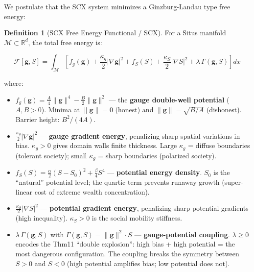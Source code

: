 \documentclass[12pt,a4paper]{article}
\theoremstyle{plain}
\theoremstyle{definition}
\newtheorem{definition}[theorem]{ Definition}
\newcommand{\R}{\mathbb{R}}
\newcommand{\cM}{\mathcal{M}}
\newcommand{\cF}{\mathcal{F}}
\newcommand{\gf}{\mathbf{g}}          %
\newcommand{\Sf}{S}                   %
\begin{document}
We postulate that the SCX system minimizes a Ginzburg-Landau type free energy:

\begin{definition}[SCX Free Energy Functional / SCX]
\label{def:free_energy}
For a Situs manifold $\cM \subset \R^d$, the total free energy is:

\begin{keyeq}
\begin{equation}
    \cF[\gf, \Sf] = \int_\cM \left[
        f_g(\gf) + \frac{\kappa_g}{2} |\nabla \gf|^2
        + f_S(\Sf) + \frac{\kappa_S}{2} |\nabla \Sf|^2
        + \lambda \, \Gamma(\gf, \Sf)
    \right] dx
    \label{eq:total_free_energy}
\end{equation}
\end{keyeq}

where:
\begin{itemize}
    \item $f_g(\gf) = \frac{A}{4}\|\gf\|^4 - \frac{B}{2}\|\gf\|^2$ —
    the \textbf{gauge double-well potential} ($A,B>0$). Minima at
    $\|\gf\|=0$ (honest) and $\|\gf\|=\sqrt{B/A}$ (dishonest).
    Barrier height: $B^2/(4A)$.

    \item $\frac{\kappa_g}{2}|\nabla\gf|^2$ — \textbf{gauge gradient energy},
    penalizing sharp spatial variations in bias. $\kappa_g>0$ gives domain
    walls finite thickness. Large $\kappa_g$ = diffuse boundaries (tolerant
    society); small $\kappa_g$ = sharp boundaries (polarized society).

    \item $f_S(\Sf) = \frac{\alpha}{2}(\Sf - \Sf_0)^2 + \frac{\beta}{4}\Sf^4$ —
    \textbf{potential energy density}. $\Sf_0$ is the ``natural'' potential
    level; the quartic term prevents runaway growth (super-linear cost of
    extreme wealth concentration).

    \item $\frac{\kappa_S}{2}|\nabla\Sf|^2$ — \textbf{potential gradient energy},
    penalizing sharp potential gradients (high inequality). $\kappa_S>0$ is
    the social mobility stiffness.

    \item $\lambda\,\Gamma(\gf,\Sf)$ with $\Gamma(\gf,\Sf) = \|\gf\|^2\cdot\Sf$ —
    \textbf{gauge-potential coupling}. $\lambda\ge0$ encodes the Thm11
    ``double explosion'': high bias + high potential = the most dangerous
    configuration. The coupling breaks the symmetry between $\Sf>0$ and
    $\Sf<0$ (high potential amplifies bias; low potential does not).
\end{itemize}
\end{definition}
\end{document}
